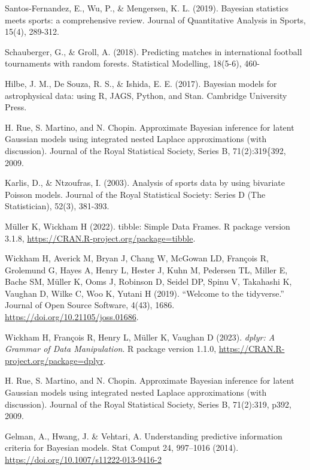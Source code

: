 \documentclass[
]{article}
\begin{document}
Santos-Fernandez, E., Wu, P., \& Mengersen, K. L. (2019). Bayesian
statistics meets sports: a comprehensive review. Journal of Quantitative
Analysis in Sports, 15(4), 289-312.

Schauberger, G., \& Groll, A. (2018). Predicting matches in
international football tournaments with random forests. Statistical
Modelling, 18(5-6), 460-

Hilbe, J. M., De Souza, R. S., \& Ishida, E. E. (2017). Bayesian models
for astrophysical data: using R, JAGS, Python, and Stan. Cambridge
University Press.

H. Rue, S. Martino, and N. Chopin. Approximate Bayesian inference for
latent Gaussian models using integrated nested Laplace approximations
(with discussion). Journal of the Royal Statistical Society, Series B,
71(2):319\{392, 2009.

Karlis, D., \& Ntzoufras, I. (2003). Analysis of sports data by using
bivariate Poisson models. Journal of the Royal Statistical Society:
Series D (The Statistician), 52(3), 381-393.

Müller K, Wickham H (2022). tibble: Simple Data Frames. R package
version 3.1.8, \url{https://CRAN.R-project.org/package=tibble}.

Wickham H, Averick M, Bryan J, Chang W, McGowan LD, François R,
Grolemund G, Hayes A, Henry L, Hester J, Kuhn M, Pedersen TL, Miller E,
Bache SM, Müller K, Ooms J, Robinson D, Seidel DP, Spinu V, Takahashi K,
Vaughan D, Wilke C, Woo K, Yutani H (2019). ``Welcome to the
tidyverse.'' Journal of Open Source Software, 4(43), 1686.
\url{https://doi.org/10.21105/joss.01686}.

Wickham H, François R, Henry L, Müller K, Vaughan D (2023). \emph{dplyr:
A Grammar of Data Manipulation}. R package version 1.1.0,
\url{https://CRAN.R-project.org/package=dplyr}.

H. Rue, S. Martino, and N. Chopin. Approximate Bayesian inference for
latent Gaussian models using integrated nested Laplace approximations
(with discussion). Journal of the Royal Statistical Society, Series B,
71(2):319, p392, 2009.

Gelman, A., Hwang, J. \& Vehtari, A. Understanding predictive
information criteria for Bayesian models. Stat Comput 24, 997--1016
(2014). \url{https://doi.org/10.1007/s11222-013-9416-2}
\end{document}
